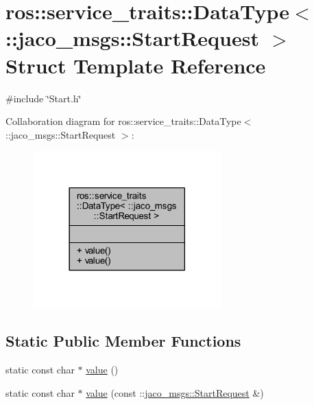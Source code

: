 \hypertarget{structros_1_1service__traits_1_1DataType_3_01_1_1jaco__msgs_1_1StartRequest_01_4}{}\section{ros\+:\+:service\+\_\+traits\+:\+:Data\+Type$<$ \+:\+:jaco\+\_\+msgs\+:\+:Start\+Request $>$ Struct Template Reference}
\label{structros_1_1service__traits_1_1DataType_3_01_1_1jaco__msgs_1_1StartRequest_01_4}


{\ttfamily \#include \char`\"{}Start.\+h\char`\"{}}



Collaboration diagram for ros\+:\+:service\+\_\+traits\+:\+:Data\+Type$<$ \+:\+:jaco\+\_\+msgs\+:\+:Start\+Request $>$\+:
\nopagebreak
\begin{figure}[H]
\begin{center}
\leavevmode
\includegraphics[width=206pt]{de/d7d/structros_1_1service__traits_1_1DataType_3_01_1_1jaco__msgs_1_1StartRequest_01_4__coll__graph}
\end{center}
\end{figure}
\subsection*{Static Public Member Functions}
\begin{DoxyCompactItemize}
\item 
static const char $\ast$ \hyperlink{structros_1_1service__traits_1_1DataType_3_01_1_1jaco__msgs_1_1StartRequest_01_4_a26566a04ba5219bab2c498ca9a7cdd3f}{value} ()
\item 
static const char $\ast$ \hyperlink{structros_1_1service__traits_1_1DataType_3_01_1_1jaco__msgs_1_1StartRequest_01_4_a944079126d3458cd78ce5cf37e2f1e4d}{value} (const \+::\hyperlink{namespacejaco__msgs_a967d4b8e4c7fe72a2b13622d4ac5b317}{jaco\+\_\+msgs\+::\+Start\+Request} \&)
\end{DoxyCompactItemize}


